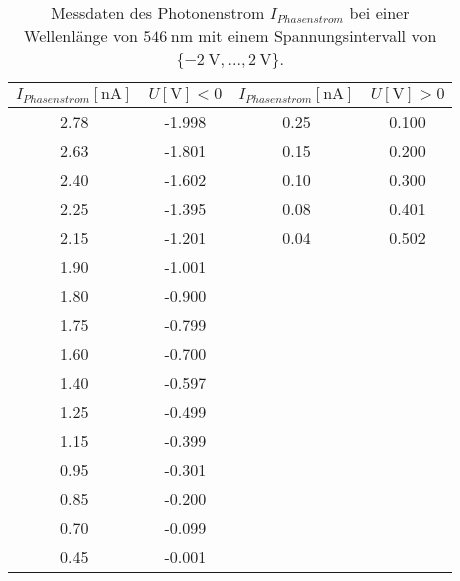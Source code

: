 \begin{table}
    \centering
    \caption{Messdaten des Photonenstrom $I_{Phasenstrom}$ bei einer Wellenlänge von $\SI{546}{\nano\meter}$ mit einem Spannungsintervall von $\{\SI{-2}{\volt},... ,\SI{2}{\volt}\}$.}
    \label{tab:tab2}
    \begin{tabular}{c c || c c}
        \toprule
        $I_{Phasenstrom}[\si{\nano\ampere}]$ & $U [\si{\volt}] < 0$ & $I_{Phasenstrom}[\si{\nano\ampere}]$ & $U [\si{\volt}] > 0$ \\
        \midrule
        2.78    &     -1.998   &  0.25        &        0.100 \\
        2.63    &     -1.801   &  0.15        &        0.200 \\        
        2.40    &     -1.602   &  0.10        &        0.300 \\
        2.25    &     -1.395   &  0.08        &        0.401 \\        
        2.15    &     -1.201   &  0.04        &        0.502 \\
        1.90    &     -1.001   &  & \\        
        1.80    &     -0.900   &  & \\
        1.75    &     -0.799   &  & \\        
        1.60    &     -0.700   &  & \\
        1.40    &     -0.597   &  & \\        
        1.25    &     -0.499   &  & \\
        1.15    &     -0.399   &  & \\        
        0.95    &     -0.301   &  & \\
        0.85    &     -0.200   &  & \\        
        0.70    &     -0.099   &  & \\
        0.45    &     -0.001   &  & \\            

       \bottomrule
    \end{tabular}
\end{table}

